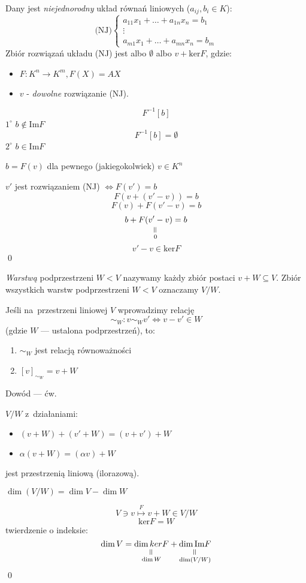 \begin{ft}
  Dany jest \textit{niejednorodny} układ równań liniowych
  ($a_{ij}, b_i \in K$):
  \[\text{(NJ)}\left\{\begin{array}{l}
      a_{11}x_1+\dots+a_{1n}x_n = b_1
      \\\vdots\\
      a_{m1}x_1+\dots+a_{mn}x_n = b_m
    \end{array}\right.\]
  Zbiór rozwiązań układu (NJ) jest albo $\emptyset$ albo ${v}+\mathrm{ker}F$,
  gdzie:
  \begin{itemize}
    \item $F: K^n \rightarrow K^m, F(X)=AX$
    \item $v$ - \textit{dowolne} rozwiązanie (NJ).
  \end{itemize}
\end{ft}
\begin{dd}
  \[F^{-1}[b]\]
  $1^\circ$ $b \notin \mathrm{Im} F$
  \[F^{-1}[b] = \emptyset\]
  $2^\circ$ $b \in \mathrm{Im} F$ 
  \begin{center}$b= F(v)$ dla pewnego (jakiegokolwiek) $v\in K^n$\end{center}

  $v'$ jest rozwiązaniem (NJ) $\Leftrightarrow F(v')=b$
  \[F(v+(v'-v)) = b\]
  \[F(v)+F(v'-v) = b\]
  \[b+\underscript{F(v'-v)}{\verteq}{0} = b\]
  \[v'-v \in \mathrm{ker}F\]
  \hfill \qed
\end{dd}
\begin{def}
  \textit{Warstwą} podprzestrzeni $W < V$ nazywamy każdy zbiór postaci
  $v + W \subseteq V$. Zbiór wszystkich warstw podprzestrzeni $W < V$
  oznaczamy $V/W$.
\end{def}  
\begin{ft}
  Jeśli na~przestrzeni liniowej $V$ wprowadzimy relację
  \[\sim_W: v\sim_Wv' \Leftrightarrow v-v'\in W\]
  (gdzie $W$ --- ustalona podprzestrzeń), to:
  \begin{enumerate}
    \item $\sim_W$ jest relacją równoważności
    \item $[v]_{\sim_W} = v+W$
  \end{enumerate}
  Dowód --- ćw.
\end{ft}
\begin{ft}
  $V/W$ z~działaniami:
  \begin{itemize}
    \item $(v+W)+(v'+W) = (v+v')+W$
    \item $\alpha(v+W) = (\alpha v) + W$
  \end{itemize}
  jest przestrzenią liniową (ilorazową).
\end{ft}
\begin{ft}
  $\dim(V/W) = \dim V - \dim W$
\end{ft}
\begin{dd}
  \[V \ni v \overset F\longmapsto v+W \in V/W\]
  \[\mathrm{ker}F = W\]
  twierdzenie o indeksie:
  \[\dim V = \underscript{\dim kerF}{\verteq}{\dim W} + \underscript{\dim\mathrm{Im}F}{\verteq}
  {\dim(V/W)}\]
  \hfill \qed
\end{dd}

